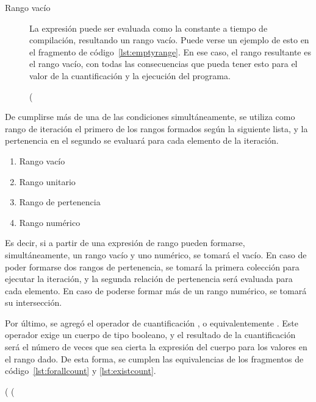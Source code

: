 \begin{description}
  \item [Rango vacío] La expresión puede ser evaluada como la constante
   a tiempo de compilación, resultando un rango vacío. Puede verse
  un ejemplo de esto en el fragmento de código~\ref{lst:emptyrange}. En ese
  caso, el rango resultante es el rango vacío, con todas las consecuencias que
  pueda tener esto para el valor de la cuantificación y la ejecución del
  programa.

\begin{gracielacode}[caption=Cuantificación con rango vacío, label=lst:emptyrange]
(%
\end{gracielacode}

\end{description}

De cumplirse más de una de las condiciones simultáneamente, se utiliza como
rango de iteración el primero de los rangos formados según la siguiente lista, y
la pertenencia en el segundo se evaluará para cada elemento de la iteración.

\begin{enumerate}
  \item Rango vacío
  \item Rango unitario
  \item Rango de pertenencia
  \item Rango numérico
\end{enumerate}

Es decir, si a partir de una expresión de rango pueden formarse,
simultáneamente, un rango vacío y uno numérico, se tomará el vacío. En caso de
poder formarse dos rangos de pertenencia, se tomará la primera colección para
ejecutar la iteración, y la segunda relación de pertenencia será evaluada para
cada elemento. En caso de poderse formar más de un rango numérico, se tomará su
intersección.

Por último, se agregó el operador de cuantificación , o
equivalentemente \ingra{#}. Este operador exige un cuerpo de tipo booleano, y el
resultado de la cuantificación será el número de veces que sea cierta la
expresión del cuerpo para los valores en el rango dado. De esta forma, se
cumplen las equivalencias de los fragmentos de código~\ref{lst:forallcount} y
\ref{lst:existcount}.

\begin{gracielacode}[caption=Equivalencia entre cuantificador universal y \textit{count}, label=lst:forallcount]
(%
    (%
\end{gracielacode}

